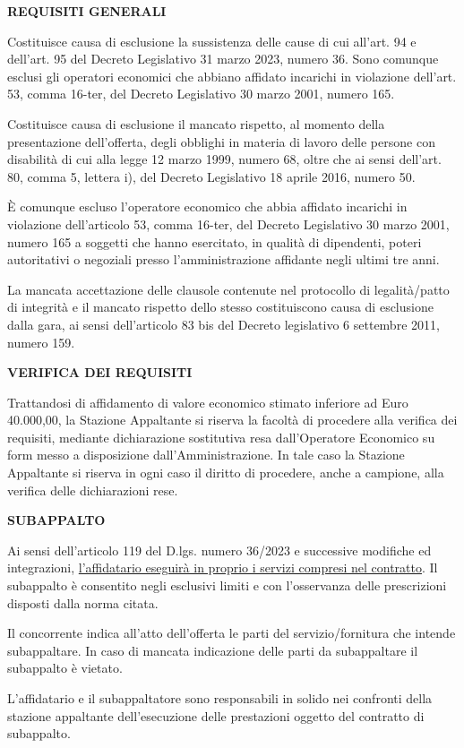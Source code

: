 \textbf{REQUISITI GENERALI}

Costituisce causa di esclusione la sussistenza delle cause di cui
all'art. 94 e dell'art. 95 del Decreto Legislativo 31 marzo 2023,
numero 36. Sono comunque esclusi gli operatori economici che abbiano
affidato incarichi in violazione dell'art. 53, comma 16-ter, del
Decreto Legislativo 30 marzo 2001, numero 165.

Costituisce causa di esclusione il mancato rispetto, al momento della
presentazione dell'offerta, degli obblighi in materia di lavoro delle
persone con disabilità di cui alla legge 12 marzo 1999, numero 68,
oltre che ai sensi dell'art. 80, comma 5, lettera i), del Decreto
Legislativo 18 aprile 2016, numero 50.

È comunque escluso l'operatore economico che abbia affidato incarichi
in violazione dell'articolo 53, comma 16-ter, del Decreto Legislativo
30 marzo 2001, numero 165 a soggetti che hanno esercitato, in qualità
di dipendenti, poteri autoritativi o negoziali presso l'amministrazione
affidante negli ultimi tre anni.

La mancata accettazione delle clausole contenute nel protocollo
di legalità/patto di integrità e il mancato rispetto dello stesso
costituiscono causa di esclusione dalla gara, ai sensi dell'articolo
83 bis del Decreto legislativo 6 settembre 2011, numero 159.

\textbf{VERIFICA DEI REQUISITI}

Trattandosi di affidamento di valore economico stimato inferiore
ad Euro 40.000,00, la Stazione Appaltante si riserva la facoltà
di procedere alla verifica dei requisiti, mediante dichiarazione
sostitutiva resa dall'Operatore Economico su form messo a disposizione
dall'Amministrazione. In tale caso la Stazione Appaltante si riserva
in ogni caso il diritto di procedere, anche a campione, alla verifica
delle dichiarazioni rese.

\textbf{SUBAPPALTO}

Ai sensi dell'articolo 119 del D.lgs. numero 36/2023 e successive
modifiche ed integrazioni,
\ul{l'affidatario eseguir\`a in proprio i servizi compresi nel
contratto}. Il subappalto è consentito negli esclusivi limiti e con
l'osservanza delle prescrizioni disposti dalla norma citata.

Il concorrente indica all'atto dell'offerta le parti del
servizio/fornitura che intende subappaltare. In caso di mancata
indicazione delle parti da subappaltare il subappalto è vietato. 

L'affidatario e il subappaltatore sono responsabili in solido nei
confronti della stazione appaltante dell'esecuzione delle prestazioni
oggetto del contratto di subappalto.

